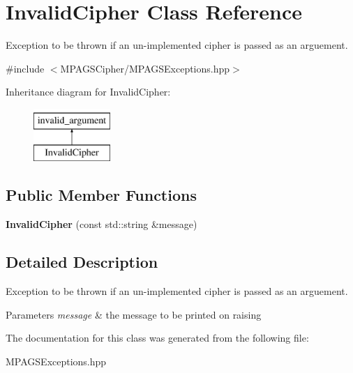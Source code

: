 \hypertarget{class_invalid_cipher}{}\section{Invalid\+Cipher Class Reference}
\label{class_invalid_cipher}


Exception to be thrown if an un-\/implemented cipher is passed as an arguement.  




{\ttfamily \#include $<$M\+P\+A\+G\+S\+Cipher/\+M\+P\+A\+G\+S\+Exceptions.\+hpp$>$}

Inheritance diagram for Invalid\+Cipher\+:\begin{figure}[H]
\begin{center}
\leavevmode
\includegraphics[height=2.000000cm]{class_invalid_cipher}
\end{center}
\end{figure}
\subsection*{Public Member Functions}
\begin{DoxyCompactItemize}
\item 
{\bfseries Invalid\+Cipher} (const std\+::string \&message)\hypertarget{class_invalid_cipher_abbc31aa58f5380031cd66c43a6aa7a37}{}\label{class_invalid_cipher_abbc31aa58f5380031cd66c43a6aa7a37}

\end{DoxyCompactItemize}


\subsection{Detailed Description}
Exception to be thrown if an un-\/implemented cipher is passed as an arguement. 


\begin{DoxyParams}{Parameters}
{\em message} & the message to be printed on raising \\
\hline
\end{DoxyParams}


The documentation for this class was generated from the following file\+:\begin{DoxyCompactItemize}
\item 
M\+P\+A\+G\+S\+Exceptions.\+hpp\end{DoxyCompactItemize}
